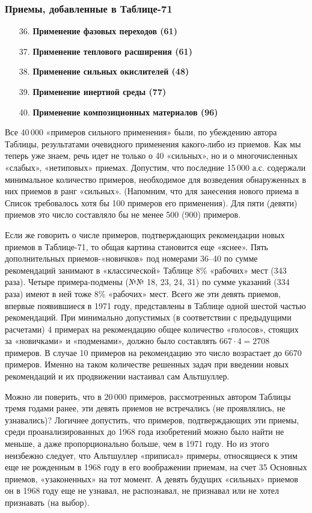 \documentclass[11pt,a4paper]{article}
\begin{document}
\subsubsection*{Приемы, добавленные в Таблице-71}
\begin{itemize}
\item[36.] \textbf{Применение фазовых переходов (61)}
\item[37.] \textbf{Применение теплового расширения (61)}
\item[38.] \textbf{Применение сильных окислителей (48)}
\item[39.] \textbf{Применение инертной среды (77)}
\item[40.] \textbf{Применение композиционных материалов (96)}
\end{itemize}
Все 40\,000 «примеров сильного применения» были, по убеждению автора Таблицы,
результатами очевидного применения какого-либо из приемов. Как мы теперь уже
знаем, речь идет не только о 40 «сильных», но и о многочисленных «слабых»,
«нетиповых» приемах. Допустим, что последние 15\,000 а.с. содержали минимальное
количество примеров, необходимое для возведения обнаруженных в них приемов в
ранг «сильных». (Напомним, что для занесения нового приема в Список
требовалось хотя бы 100 примеров его применения). Для пяти (девяти) приемов
это число составляло бы не менее 500 (900) примеров.

Если же говорить о числе примеров, подтверждающих рекомендации новых приемов в
Таблице-71, то общая картина становится еще «яснее». Пять дополнительных
приемов-«новичков» под номерами 36--40 по сумме рекомендаций занимают в
«классической» Таблице 8\% «рабочих» мест (343 раза). Четыре примера-подмены
(№№ 18, 23, 24, 31) по сумме указаний (334 раза) имеют в ней тоже 8\%
«рабочих» мест. Всего же эти девять приемов, впервые появившиеся в 1971 году,
представлены в Таблице одной шестой частью рекомендаций. При минимально
допустимых (в соответствии с предыдущими расчетами) 4 примерах на рекомендацию
общее количество «голосов», стоящих за «новичками» и «подменами», должно было
составлять $667\cdot 4 = 2708$ примеров. В случае 10 примеров на рекомендацию
это число возрастает до 6670 примеров. Именно на таком количестве решенных
задач при введении новых рекомендаций и их продвижении настаивал сам
Альтшуллер.  \cite[стр. 274]{Altshuller1973}

Можно ли поверить, что в 20\,000 примеров, рассмотренных автором Таблицы тремя
годами ранее, эти девять приемов не встречались (не проявлялись, не
узнавались)? Логичнее допустить, что примеров, подтверждающих эти приемы,
среди проанализированных до 1968 года изобретений можно было найти не меньше,
а даже пропорционально больше, чем в 1971 году. Но из этого неизбежно следует,
что Альтшуллер «приписал» примеры, относящиеся к этим еще не рожденным в 1968
году в его воображении приемам, на счет 35 Основных приемов, «узаконенных» на
тот момент. А девять будущих «сильных» приемов он в 1968 году еще не узнавал,
не распознавал, не признавал или не хотел признавать (на выбор).
\end{document}
